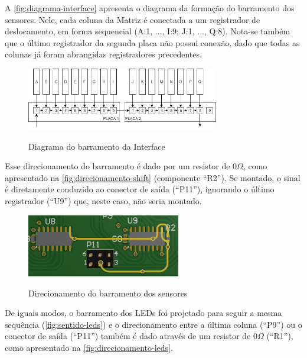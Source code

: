 A \autoref{fig:diagrama-interface} apresenta o diagrama da formação do barramento dos sensores. Nele, cada coluna da Matriz é conectada a um registrador de deslocamento, em forma sequencial (A:1, ..., I:9; J:1, ..., Q:8). Nota-se também que o último registrador da segunda placa não possui conexão, dado que todas as colunas já foram abrangidas registradores precedentes.

\begin{figure}[H]
    \centering
    \caption{Diagrama do barramento da Interface}
    \includegraphics[width=0.75\textwidth]{./dados/figuras/interface}
    \label{fig:diagrama-interface}
\end{figure}

Esse direcionamento do barramento é dado por um resistor de $0\Omega$, como apresentado na \autoref{fig:direcionamento-shift} (componente ``R2''). Se montado, o sinal é diretamente conduzido ao conector de saída (``P11''), ignorando o último registrador (``U9'') que, neste caso, não seria montado.

\begin{figure}[H]
    \centering
    \caption{Direcionamento do barramento dos sensores}
    \includegraphics[width=0.6\textwidth]{./dados/figuras/res-dir-shift}
    \label{fig:direcionamento-shift}
\end{figure}

De iguais modos, o barramento dos LEDs foi projetado para seguir a mesma sequência (\autoref{fig:sentido-leds}) e o direcionamento entre a última coluna (``P9'') ou o conector de saída (``P11'') também é dado através de um resistor de $0\Omega$ (``R1''), como apresentado na \autoref{fig:direcionamento-leds}.

